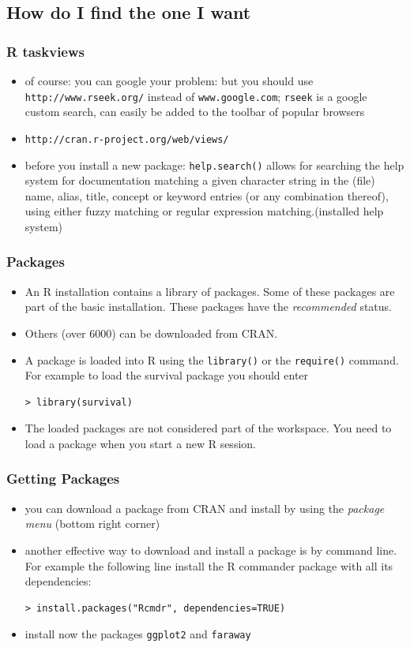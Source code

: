 \documentclass[xcolor={table},c]{beamer}
\begin{document}
\subsection{How do I find the one I want}
\begin{frame}\frametitle{R taskviews}
  \begin{itemize}
    \item of course: you can google your problem: but you should use \texttt{http://www.rseek.org/} instead of \texttt{www.google.com}; \texttt{rseek} is a google custom search, can easily be added to the toolbar of popular browsers 
    \item \texttt{http://cran.r-project.org/web/views/}
    \item before you install a new package: \texttt{help.search()} allows for searching the help system for documentation matching a given character string in the (file) name, alias, title, concept
      or keyword entries (or any combination thereof), using either
      fuzzy matching or regular expression matching.(installed help system)
  \end{itemize}
\end{frame}

\begin{frame}[fragile]\frametitle{Packages}
  \begin{itemize}
  \item An R installation contains a library of packages. Some of these packages are part of the basic installation. These packages have the \emph{ recommended } status.
  \item Others (over 6000) can be downloaded from CRAN.
  \item A package is loaded into R using the \texttt{library()} or the \texttt{require()} command. For example to load the survival
package you should enter
\begin{verbatim}
> library(survival)
\end{verbatim}
\item The loaded packages are not considered part of the workspace.
You need to load a package when you start a new R session.
\end{itemize}
\end{frame}

\begin{frame}[fragile]\frametitle{Getting Packages}
\begin{itemize}
\item you can download a package from CRAN and install by using the \emph{package menu} (bottom right corner)
\item another effective way to download and install a package is by command line. For example the
following line install the R commander package with all its dependencies:

\begin{verbatim}
> install.packages("Rcmdr", dependencies=TRUE)
\end{verbatim}
\item install now the packages \texttt{ggplot2} and \texttt{faraway}
\end{itemize}
\end{frame}
\end{document}
